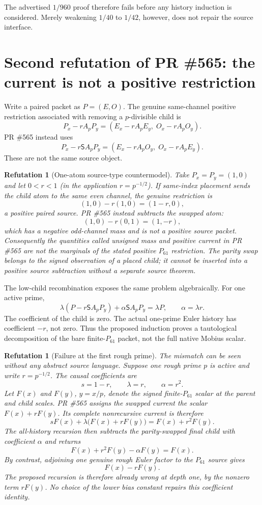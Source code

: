 \documentclass[11pt]{article}
\newtheorem{refutation}[theorem]{Refutation}
\newcommand{\1}{\mathbf 1}
\begin{document}
The advertised $1/960$ proof therefore fails before any history induction is considered.  Merely weakening $1/40$ to $1/42$, however, does not repair the source interface.

\section{Second refutation of PR \#565: the current is not a positive restriction}

Write a paired packet as $P=(E,O)$.  The genuine same-channel positive restriction associated with removing a $p$-divisible child is
\[
P_x-rA_pP_y=(E_x-rA_pE_y,\;O_x-rA_pO_y).
\]
PR \#565 instead uses
\[
P_x-r\mathsf SA_pP_y=(E_x-rA_pO_y,\;O_x-rA_pE_y).
\]
These are not the same source object.

\begin{refutation}[One-atom source-type countermodel]\label{ref:oneatom}
Take $P_x=P_y=(1,0)$ and let $0<r<1$ (in the application $r=p^{-1/2}$).  If same-index placement sends the child atom to the same even channel, the genuine restriction is
\[
(1,0)-r(1,0)=(1-r,0),
\]
a positive paired source.  PR \#565 instead subtracts the swapped atom:
\[
(1,0)-r(0,1)=(1,-r),
\]
which has a negative odd-channel mass and is not a positive source packet.  Consequently the quantities called unsigned mass and positive current in PR \#565 are not the marginals of the stated positive $P_{61}$ restriction.  The parity swap belongs to the signed observation of a placed child; it cannot be inserted into a positive source subtraction without a separate source theorem.
\end{refutation}

The low-child recombination exposes the same problem algebraically.  For one active prime,
\[
\lambda(P-r\mathsf SA_pP_y)+\alpha\mathsf SA_pP_y=\lambda P,
\qquad\alpha=\lambda r.
\]
The coefficient of the child is zero.  The actual one-prime Euler history has coefficient $-r$, not zero.  Thus the proposed induction proves a tautological decomposition of the bare finite-$P_{61}$ packet, not the full native Mobius scalar.

\begin{refutation}[Failure at the first rough prime]\label{ref:depthone}
The mismatch can be seen without any abstract source language.  Suppose one rough prime $p$ is active and write $r=p^{-1/2}$.  The causal coefficients are
\[
s=1-r,\qquad \lambda=r,\qquad \alpha=r^2.
\]
Let $F(x)$ and $F(y)$, $y=x/p$, denote the signed finite-$P_{61}$ scalar at the parent and child scales.  PR \#565 assigns the swapped current the scalar $F(x)+rF(y)$.  Its complete nonrecursive current is therefore
\[
sF(x)+\lambda\bigl(F(x)+rF(y)\bigr)
=F(x)+r^2F(y).
\]
The all-history recursion then subtracts the parity-swapped final child with coefficient $\alpha$ and returns
\[
F(x)+r^2F(y)-\alpha F(y)=F(x).
\]
By contrast, adjoining one genuine rough Euler factor to the $P_{61}$ source gives
\[
F(x)-rF(y).
\]
The proposed recursion is therefore already wrong at depth one, by the nonzero term $rF(y)$.  No choice of the lower bias constant repairs this coefficient identity.
\end{refutation}
\end{document}
